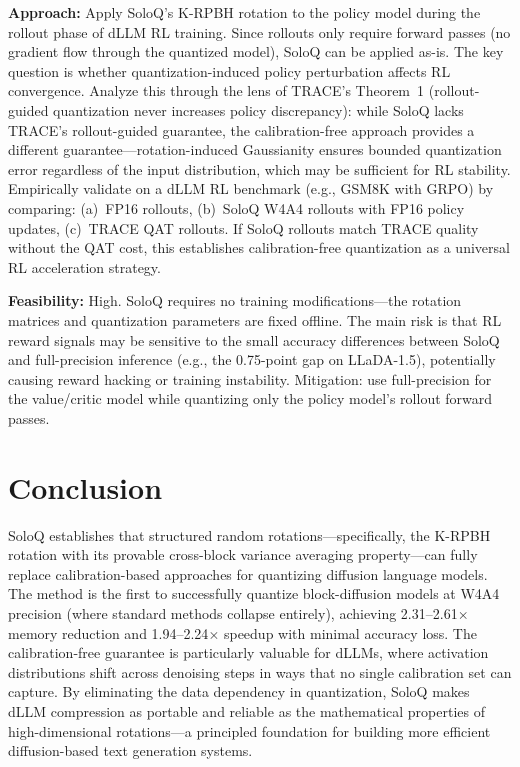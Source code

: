 \documentclass[11pt,a4paper]{article}
\begin{document}
\textbf{Approach:} Apply SoloQ's K-RPBH rotation to the policy model during the rollout phase of dLLM RL training. Since rollouts only require forward passes (no gradient flow through the quantized model), SoloQ can be applied as-is. The key question is whether quantization-induced policy perturbation affects RL convergence. Analyze this through the lens of TRACE's Theorem~1 (rollout-guided quantization never increases policy discrepancy): while SoloQ lacks TRACE's rollout-guided guarantee, the calibration-free approach provides a different guarantee---rotation-induced Gaussianity ensures bounded quantization error regardless of the input distribution, which may be sufficient for RL stability. Empirically validate on a dLLM RL benchmark (e.g., GSM8K with GRPO) by comparing: (a)~FP16 rollouts, (b)~SoloQ W4A4 rollouts with FP16 policy updates, (c)~TRACE QAT rollouts. If SoloQ rollouts match TRACE quality without the QAT cost, this establishes calibration-free quantization as a universal RL acceleration strategy.

\textbf{Feasibility:} High. SoloQ requires no training modifications---the rotation matrices and quantization parameters are fixed offline. The main risk is that RL reward signals may be sensitive to the small accuracy differences between SoloQ and full-precision inference (e.g., the 0.75-point gap on LLaDA-1.5), potentially causing reward hacking or training instability. Mitigation: use full-precision for the value/critic model while quantizing only the policy model's rollout forward passes.

\section{Conclusion}
SoloQ establishes that structured random rotations---specifically, the K-RPBH rotation with its provable cross-block variance averaging property---can fully replace calibration-based approaches for quantizing diffusion language models. The method is the first to successfully quantize block-diffusion models at W4A4 precision (where standard methods collapse entirely), achieving 2.31--2.61$\times$ memory reduction and 1.94--2.24$\times$ speedup with minimal accuracy loss. The calibration-free guarantee is particularly valuable for dLLMs, where activation distributions shift across denoising steps in ways that no single calibration set can capture. By eliminating the data dependency in quantization, SoloQ makes dLLM compression as portable and reliable as the mathematical properties of high-dimensional rotations---a principled foundation for building more efficient diffusion-based text generation systems.
\end{document}
